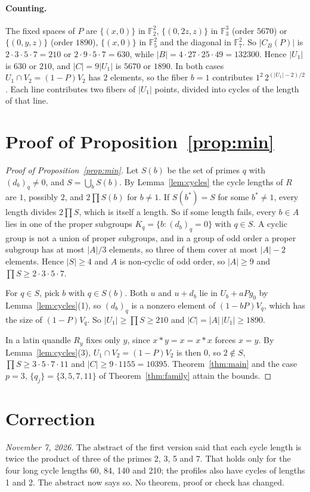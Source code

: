 \documentclass[11pt]{article}
\newcommand{\F}{\mathbb{F}}
\begin{document}
\begin{appendices}
\paragraph{Counting.} The fixed spaces of $P$ are $\{(x,0)\}$ in $\F_2^2$,
$\{(0,2z,z)\}$ in $\F_3^3$ (order $5670$) or $\{(0,y,z)\}$ (order $1890$),
$\{(x,0)\}$ in $\F_5^2$ and the diagonal in $\F_7^2$. So $|C_B(P)|$ is
$2\cdot3\cdot5\cdot7=210$ or $2\cdot9\cdot5\cdot7=630$, while
$|B|=4\cdot27\cdot25\cdot49=132300$. Hence $|U_1|$ is $630$ or $210$, and
$|C|=9|U_1|$ is $5670$ or $1890$. In both cases $U_1\cap V_2=(1-P)V_2$ has
$2$ elements, so the fiber $b=1$ contributes $1^2\,2^{(|U_1|-2)/2}$. Each
line contributes two fibers of $|U_1|$ points, divided into cycles of the
length of that line.

\section{Proof of Proposition~\ref{prop:min}}\label{app:min}

\begin{proof}[Proof of Proposition~\ref{prop:min}]
Let $S(b)$ be the set of primes $q$ with $(d_b)_q\ne0$, and $S=\bigcup_b
S(b)$. By Lemma~\ref{lem:cycles} the cycle lengths of $R$ are $1$, possibly
$2$, and $2\prod S(b)$ for $b\ne1$. If $S(b^*)=S$ for some $b^*\ne1$, every
length divides $2\prod S$, which is itself a length. So if some length
fails, every $b\in A$ lies in one of the proper subgroups
$K_q=\{b:(d_b)_q=0\}$ with $q\in S$. A cyclic group is not a union of
proper subgroups, and in a group of odd order a proper subgroup has at most
$|A|/3$ elements, so three of them cover at most $|A|-2$ elements. Hence
$|S|\ge4$ and $A$ is non-cyclic of odd order, so $|A|\ge9$ and $\prod S\ge
2\cdot3\cdot5\cdot7$.

For $q\in S$, pick $b$ with $q\in S(b)$. Both $u$ and $u+d_b$ lie in
$U_b+aPg_0$ by Lemma~\ref{lem:cycles}(1), so $(d_b)_q$ is a nonzero element
of $(1-bP)V_q$, which has the size of $(1-P)V_q$. So $|U_1|\ge\prod S\ge210$
and $|C|=|A|\,|U_1|\ge1890$.

In a latin quandle $R_y$ fixes only $y$, since $x*y=x=x*x$ forces $x=y$. By
Lemma~\ref{lem:cycles}(3), $U_1\cap V_2=(1-P)V_2$ is then $0$, so $2\notin
S$, $\prod S\ge3\cdot5\cdot7\cdot11$ and $|C|\ge9\cdot1155=10395$.
Theorem~\ref{thm:main} and the case $p=3$, $\{q_j\}=\{3,5,7,11\}$ of
Theorem~\ref{thm:family} attain the bounds.
\end{proof}

\section{Correction}\label{app:correction}

\emph{November 7, 2026.} The abstract of the first version said that each
cycle length is twice the product of three of the primes 2, 3, 5 and 7.
That holds only for the four long cycle lengths 60, 84, 140 and 210; the
profiles also have cycles of lengths 1 and 2. The abstract now says so. No
theorem, proof or check has changed.

\end{appendices}
\end{document}

